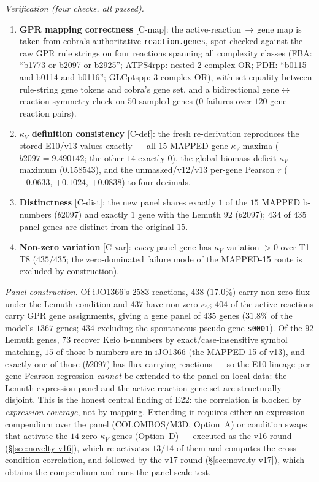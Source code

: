 \documentclass[11pt,a4paper]{article}
\theoremstyle{plain}
\theoremstyle{definition}
\theoremstyle{remark}
\begin{document}
\emph{Verification (four checks, all passed).}
\begin{enumerate}\itemsep0pt
\item \textbf{GPR mapping correctness} {[C-map]}: the
  active-reaction$\,\to\,$gene map is taken from cobra's authoritative
  \texttt{reaction.genes}, spot-checked against the raw GPR rule
  strings on four reactions spanning all complexity classes (FBA:
  ``b1773 or b2097 or b2925''; ATPS4rpp: nested 2-complex OR;
  PDH: ``b0115 and b0114 and b0116''; GLCptspp: 3-complex OR), with
  set-equality between rule-string gene tokens and cobra's gene set,
  and a bidirectional gene$\leftrightarrow$reaction symmetry check on
  $50$ sampled genes ($0$ failures over $120$ gene-reaction pairs).
\item \textbf{$\kappa_V$ definition consistency} {[C-def]}: the fresh
  re-derivation reproduces the stored E10/v13 values exactly --- all
  $15$ MAPPED-gene $\kappa_V$ maxima ($b2097 = 9.490142$; the other
  $14$ exactly $0$), the global biomass-deficit $\kappa_V$ maximum
  ($0.158543$), and the unmasked/v12/v13 per-gene Pearson $r$
  ($-0.0633$, $+0.1024$, $+0.0838$) to four decimals.
\item \textbf{Distinctness} {[C-dist]}: the new panel shares exactly
  $1$ of the $15$ MAPPED b-numbers ($b2097$) and exactly $1$ gene with
  the Lemuth $92$ ($b2097$); $434$ of $435$ panel genes are distinct
  from the original $15$.
\item \textbf{Non-zero variation} {[C-var]}: \emph{every} panel gene
  has $\kappa_V$ variation $> 0$ over T1--T8 ($435/435$; the
  zero-dominated failure mode of the MAPPED-15 route is excluded by
  construction).
\end{enumerate}

\emph{Panel construction.} Of iJO1366's $2583$ reactions, $438$
($17.0\%$) carry non-zero flux under the Lemuth condition and $437$
have non-zero $\kappa_V$; $404$ of the active reactions carry GPR
gene assignments, giving a gene panel of $435$ genes ($31.8\%$ of the
model's $1367$ genes; $434$ excluding the spontaneous pseudo-gene
\texttt{s0001}). Of the $92$ Lemuth genes, $73$ recover Keio b-numbers
by exact/case-insensitive symbol matching, $15$ of those b-numbers are
in iJO1366 (the MAPPED-15 of v13), and exactly one of those ($b2097$)
has flux-carrying reactions --- so the E10-lineage per-gene Pearson
regression \emph{cannot} be extended to the panel on local data: the
Lemuth expression panel and the active-reaction gene set are
structurally disjoint. This is the honest central finding of E22: the
correlation is blocked by \emph{expression coverage}, not by mapping.
Extending it requires either an expression compendium over the panel
(COLOMBOS/M3D, Option~A) or condition swaps that activate
the $14$ zero-$\kappa_V$ genes (Option~D) --- executed as the v16
round (\S\ref{sec:novelty-v16}), which re-activates $13/14$ of them
and computes the cross-condition correlation, and followed by the
v17 round (\S\ref{sec:novelty-v17}), which obtains the compendium
and runs the panel-scale test.
\end{document}

